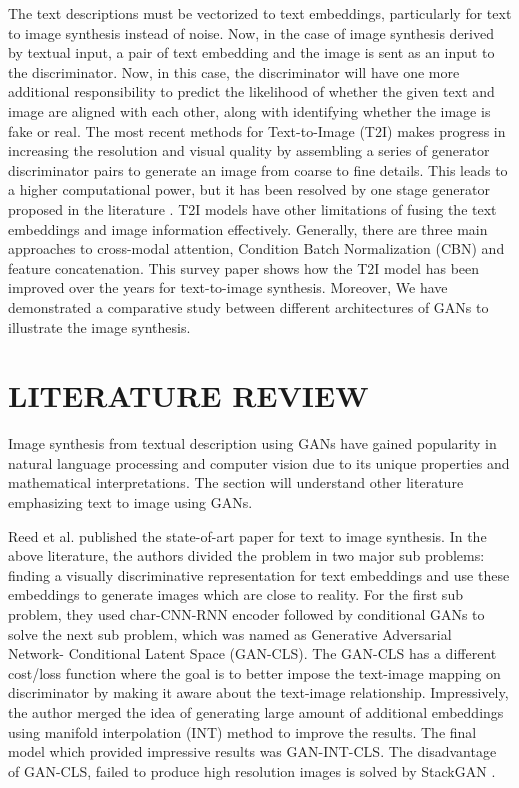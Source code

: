 \documentclass[conference]{IEEEtran}
\begin{document}
	The text descriptions must be vectorized to text embeddings, particularly for text to image synthesis instead of noise. Now, in the case of image synthesis derived by textual input, a pair of text embedding and the image is sent as an input to the discriminator. Now, in this case, the discriminator will have one more additional responsibility to predict the likelihood of whether the given text and image are aligned with each other, along with identifying whether the image is fake or real. The most recent methods for Text-to-Image (T2I) makes progress in increasing the resolution and visual quality by assembling a series of generator discriminator pairs to generate an image from coarse to fine details. This leads to a higher computational power, but it has been resolved by one stage generator proposed in the literature \cite{b1}. T2I models have other limitations of fusing the text embeddings and image information effectively. Generally, there are three main approaches to cross-modal attention, Condition Batch Normalization (CBN) and feature concatenation. This survey paper shows how the T2I model has been improved over the years for text-to-image synthesis. Moreover, We have demonstrated a comparative study between different architectures of GANs to illustrate the image synthesis.
	
	
	\section{LITERATURE REVIEW}
	
	Image synthesis from textual description using GANs have gained popularity in natural language processing and computer vision due to its unique properties and mathematical interpretations. The section will understand other literature emphasizing text to image using GANs.
	
	Reed et al.\cite{b2} published the state-of-art paper for text to image synthesis. In the above literature, the authors divided the problem in two major sub problems: finding a visually discriminative representation for text embeddings and use these embeddings to generate images which are close to reality. For the first sub problem, they used char-CNN-RNN encoder followed by conditional GANs to solve the next sub problem, which was named as Generative Adversarial Network- Conditional Latent Space (GAN-CLS). The GAN-CLS has a different cost/loss function where the goal is to better impose the text-image mapping on discriminator by making it aware about the text-image relationship. Impressively, the author merged the idea of generating large amount of additional embeddings using manifold interpolation (INT) method to improve the results. The final model which provided impressive results was GAN-INT-CLS. The disadvantage of GAN-CLS, failed to produce high resolution images is solved by StackGAN \cite{b3}.
	
\end{document}

